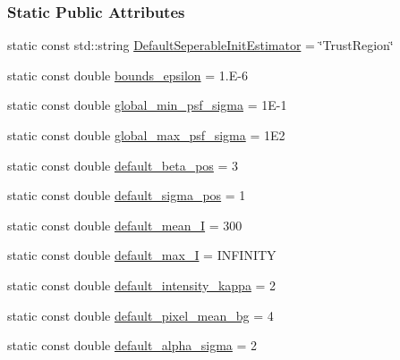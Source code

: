 \subsubsection*{Static Public Attributes}
\begin{DoxyCompactItemize}
\item 
static const std\+::string \hyperlink{classmappel_1_1PointEmitterModel_ad8c3dc629d75d22f25855a5f1ba8729f}{Default\+Seperable\+Init\+Estimator} = \char`\"{}Trust\+Region\char`\"{}
\item 
static const double \hyperlink{classmappel_1_1PointEmitterModel_ac987a119137b85a27704b1c40e3fab8c}{bounds\+\_\+epsilon} = 1.\+E-\/6
\item 
static const double \hyperlink{classmappel_1_1PointEmitterModel_a77d0ca98d77cb8b94117ece2a5b182a4}{global\+\_\+min\+\_\+psf\+\_\+sigma} = 1\+E-\/1
\item 
static const double \hyperlink{classmappel_1_1PointEmitterModel_a5e79dba8966c25c4e9c675cd1a2cab70}{global\+\_\+max\+\_\+psf\+\_\+sigma} = 1\+E2
\item 
static const double \hyperlink{classmappel_1_1PointEmitterModel_a9b64c3b4b97ac2805340c0779c71398c}{default\+\_\+beta\+\_\+pos} = 3
\item 
static const double \hyperlink{classmappel_1_1PointEmitterModel_aa98a73b9e3937c00b07596d3928df3ca}{default\+\_\+sigma\+\_\+pos} = 1
\item 
static const double \hyperlink{classmappel_1_1PointEmitterModel_a575dd30a0afb886db82ac725c8cc8df3}{default\+\_\+mean\+\_\+I} = 300
\item 
static const double \hyperlink{classmappel_1_1PointEmitterModel_acca80757a9a285a9e6eedea167d038c7}{default\+\_\+max\+\_\+I} = I\+N\+F\+I\+N\+I\+TY
\item 
static const double \hyperlink{classmappel_1_1PointEmitterModel_ad1f21ed3be543deed3c78a0494cb2984}{default\+\_\+intensity\+\_\+kappa} = 2
\item 
static const double \hyperlink{classmappel_1_1PointEmitterModel_abe82d75be8586234657a61e2f137a6c8}{default\+\_\+pixel\+\_\+mean\+\_\+bg} = 4
\item 
static const double \hyperlink{classmappel_1_1PointEmitterModel_a0d9f2c5438940f329e75708987e8b343}{default\+\_\+alpha\+\_\+sigma} = 2
\end{DoxyCompactItemize}
